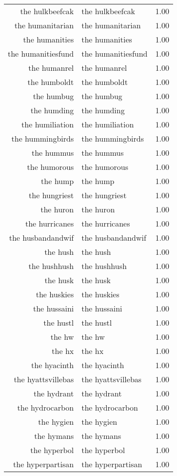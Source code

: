 \begin{table}[ht]
\begin{tabular}{rlr}
  the hulkbeefcak & the hulkbeefcak & 1.00 \\ 
  the humanitarian & the humanitarian & 1.00 \\ 
  the humanities & the humanities & 1.00 \\ 
  the humanitiesfund & the humanitiesfund & 1.00 \\ 
  the humanrel & the humanrel & 1.00 \\ 
  the humboldt & the humboldt & 1.00 \\ 
  the humbug & the humbug & 1.00 \\ 
  the humding & the humding & 1.00 \\ 
  the humiliation & the humiliation & 1.00 \\ 
  the hummingbirds & the hummingbirds & 1.00 \\ 
  the hummus & the hummus & 1.00 \\ 
  the humorous & the humorous & 1.00 \\ 
  the hump & the hump & 1.00 \\ 
  the hungriest & the hungriest & 1.00 \\ 
  the huron & the huron & 1.00 \\ 
  the hurricanes & the hurricanes & 1.00 \\ 
  the husbandandwif & the husbandandwif & 1.00 \\ 
  the hush & the hush & 1.00 \\ 
  the hushhush & the hushhush & 1.00 \\ 
  the husk & the husk & 1.00 \\ 
  the huskies & the huskies & 1.00 \\ 
  the hussaini & the hussaini & 1.00 \\ 
  the hustl & the hustl & 1.00 \\ 
  the hw & the hw & 1.00 \\ 
  the hx & the hx & 1.00 \\ 
  the hyacinth & the hyacinth & 1.00 \\ 
  the hyattsvillebas & the hyattsvillebas & 1.00 \\ 
  the hydrant & the hydrant & 1.00 \\ 
  the hydrocarbon & the hydrocarbon & 1.00 \\ 
  the hygien & the hygien & 1.00 \\ 
  the hymans & the hymans & 1.00 \\ 
  the hyperbol & the hyperbol & 1.00 \\ 
  the hyperpartisan & the hyperpartisan & 1.00 \\ 

\end{tabular}
\end{table}
